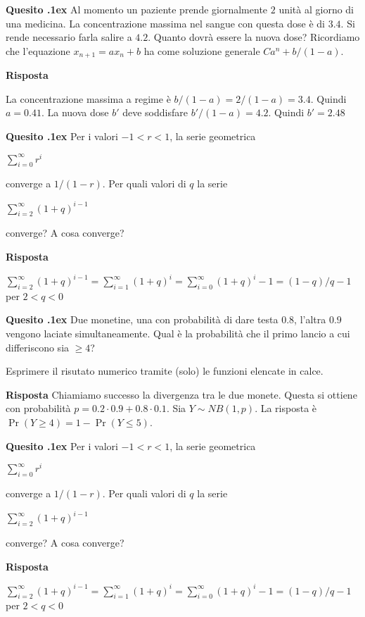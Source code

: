 \documentclass[11pt,twoside,a4paper]{article}
\newcounter{quesito}
\newenvironment{question}{\addtocounter{quesito}{1}\par\textbf{Quesito \thequesito.\kern1ex}}{\vspace{0.5\parskip}}
\newenvironment{answer}{\par\textbf{Risposta\quad}}{\vspace{\parskip}}
\begin{document}
\begin{question}
Al momento un paziente prende giornalmente $2$ unità al giorno di una medicina. La concentrazione massima nel sangue con questa dose è di $3.4$. Si rende necessario farla salire a $4.2$. Quanto dovrà essere la nuova dose? Ricordiamo che l'equazione $x_{n+1}=ax_n +b$ ha come soluzione generale $Ca^n+b/(1-a)$.
\begin{answer}

La concentrazione massima a regime è $b/(1-a)=2/(1-a)=3.4$. Quindi $a=0.41$. La nuova dose $b'$ deve soddisfare $b'/(1-a)=4.2$. Quindi $b'=2.48$
\end{answer}
\end{question}

\begin{question} Per i valori $-1<r<1$, la serie geometrica 

\hfil$\displaystyle \sum^\infty_{i=0}r^i$ 

converge a $1/(1-r)$. Per quali valori di $q$ la serie 

\hfil$\displaystyle \sum^\infty_{i=2}(1+q)^{i-1}$

converge? A cosa converge?
\begin{answer}

$\displaystyle \sum^\infty_{i=2}(1+q)^{i-1}=\sum^\infty_{i=1}(1+q)^{i}=\sum^\infty_{i=0}(1+q)^{i}-1=(1-q)/q -1$ per $2<q<0$

\end{answer}
\end{question}



\begin{question}
Due monetine, una con probabilità di dare testa $0.8$, l'altra $0.9$ vengono laciate simultaneamente. Qual è la probabilità che il primo lancio a cui differiscono sia $\ge 4$? 

Esprimere il risutato numerico tramite (solo) le funzioni elencate in calce.
\begin{answer}
Chiamiamo successo la divergenza tra le due monete. Questa si ottiene con probabilità $p=0.2\cdot0.9+0.8\cdot0.1$. Sia $Y\sim NB(1,p)$. La risposta è $\Pr(Y\ge 4)=1-\Pr(Y\le 5)$.
\end{answer}
\end{question}

\begin{question} Per i valori $-1<r<1$, la serie geometrica 

\hfil$\displaystyle \sum^\infty_{i=0}r^i$ 

converge a $1/(1-r)$. Per quali valori di $q$ la serie 

\hfil$\displaystyle \sum^\infty_{i=2}(1+q)^{i-1}$

converge? A cosa converge?
\begin{answer}

$\displaystyle \sum^\infty_{i=2}(1+q)^{i-1}=\sum^\infty_{i=1}(1+q)^{i}=\sum^\infty_{i=0}(1+q)^{i}-1=(1-q)/q -1$ per $2<q<0$

\end{answer}
\end{question}
\end{document}
